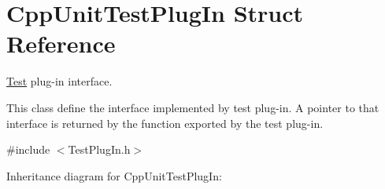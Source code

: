\hypertarget{struct_cpp_unit_test_plug_in}{\section{Cpp\+Unit\+Test\+Plug\+In Struct Reference}
\label{struct_cpp_unit_test_plug_in}
}


\hyperlink{class_test}{Test} plug-\/in interface.

This class define the interface implemented by test plug-\/in. A pointer to that interface is returned by the function exported by the test plug-\/in.  




{\ttfamily \#include $<$Test\+Plug\+In.\+h$>$}



Inheritance diagram for Cpp\+Unit\+Test\+Plug\+In\+:
